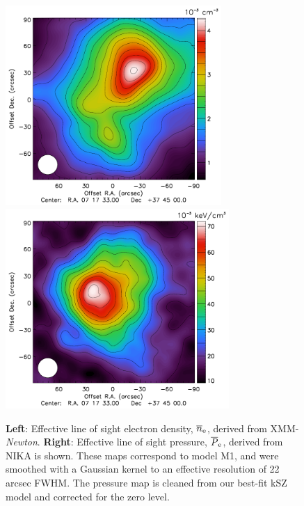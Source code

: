 \documentclass[twocolumn,traditabstract]{aa}
\begin{document}
\begin{figure}[h]
\centering
\includegraphics[height=7.6cm]{Figure/Thermo_N1.pdf}
\includegraphics[height=7.6cm]{Figure/Thermo_Pclean1.pdf}
\caption{\footnotesize{{\bf Left}: Effective line of sight electron density, $\overline{n}_{\rm e}$, derived from XMM-\textit{Newton}. {\bf Right}: Effective line of sight pressure, $\overline{P}_{\rm e}$, derived from NIKA is shown. These maps correspond to model M1, and were smoothed with a Gaussian kernel to an effective resolution of 22 arcsec FWHM. The pressure map is cleaned from our best-fit kSZ model and corrected for the zero level.}}\label{fig:Input_maps}
\end{figure}

\end{document}
